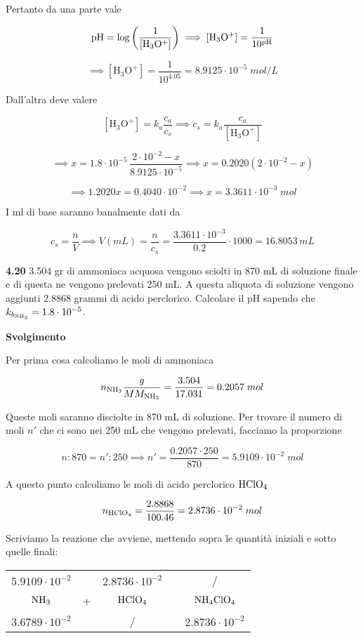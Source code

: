 Pertanto da una parte vale

$$\rm pH=\log{\left(\frac{1}{[H_3O^+]}\right)}
\implies
[H_3O^+]=\frac{1}{10^{pH}}$$

$$\implies
[\text{H}_3\text{O}^+]=\frac{1}{10^{4.05}}=8.9125 \cdot 10^{-5}\;mol/L$$

Dall'altra deve valere

$$[\text{H}_3\text{O}^+]=k_a\frac{c_a}{c_s}
\implies
c_s=k_a\frac{c_a}{[\text{H}_3\text{O}^+]}$$

$$\implies
x=1.8 \cdot 10^{-5}\,\frac{2 \cdot 10^{-2} - x}{8.9125 \cdot 10^{-5}}
\implies
x=0.2020(2 \cdot 10^{-2} - x)$$

$$\implies
1.2020 x = 0.4040 \cdot 10^{-2}
\implies x=3.3611 \cdot 10^{-3}\;mol$$

I ml di base saranno banalmente dati da

$$c_s=\frac{n}{V}
\implies
V(mL)=\frac{n}{c_s}=\frac{3.3611 \cdot 10^{-3}}{0.2} \cdot 1000
=16.8053\,mL$$

\vspace{0.2cm}\textbf{4.20} 3.504 gr di ammoniaca acquosa vengono sciolti in 870 mL di soluzione finale e di questa ne vengono prelevati 250 mL. A questa aliquota di soluzione vengono aggiunti 2.8868 grammi di acido perclorico. Calcolare il pH sapendo che $k_{b_{\rm NH_3}}=1.8 \cdot 10^{-5}$.

\vspace{0.2cm}\large\textbf{Svolgimento}\normalsize

\vspace{0.2cm}Per prima cosa calcoliamo le moli di ammoniaca

$$n_{\rm NH_3}\frac{g}{MM_{\rm NH_3}}
=\frac{3.504}{17.031}=0.2057\;mol$$

Queste moli saranno disciolte in 870 mL di soluzione. Per trovare il numero di moli $n'$ che ci sono nei 250 mL che vengono prelevati, facciamo la proporzione

$$n:870=n':250
\implies
n'=\frac{0.2057 \cdot 250}{870}=5.9109 \cdot 10^{-2}\;mol$$

A questo punto calcoliamo le moli di acido perclorico $\rm HClO_4$

$$n_{\rm HClO_4}=\frac{2.8868}{100.46}=2.8736 \cdot 10^{-2}\;mol$$

Scriviamo la reazione che avviene, mettendo sopra le quantità iniziali e sotto quelle finali:

\begin{center}
    \begin{tabular}{ccccc}
        $5.9109 \cdot 10^{-2}$ &  & $2.8736 \cdot 10^{-2}$ & & /\\
        $\rm NH_3$ & + & $\rm HClO_4$ & \ce{->} & $\rm NH_4ClO_4$\\
        $3.6789 \cdot 10^{-2}$ &  & / & & $2.8736 \cdot 10^{-2}$\\
    \end{tabular}
\end{center}

